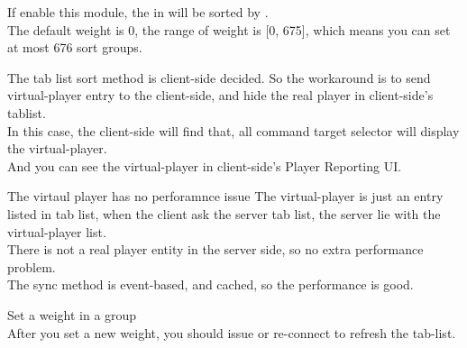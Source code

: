 
If enable this module, the  in  will be sorted by .
\\
The default weight is 0, the range of weight is [0, 675], which means you can set at most 676 sort groups.

The tab list sort method is client-side decided.
So the workaround is to send virtual-player entry to the client-side, and hide the real player in client-side's tablist.
\\
In this case, the client-side will find that, all command target selector will display the virtual-player.
\\
And you can see the virtual-player in client-side's Player Reporting UI.

\begin{note}{The virtaul player has no perforamnce issue}
    The virtual-player is just an entry listed in tab list, when the client ask the server tab list, the server lie with the virtual-player list.
    \\
    There is not a real player entity in the server side, so no extra performance problem.
    \\
    The sync method is event-based, and cached, so the performance is good.
\end{note}

\begin{example}{Set a weight in a group}
    \\
    After you set a new weight, you should issue  or re-connect to refresh the tab-list.
\end{example}



